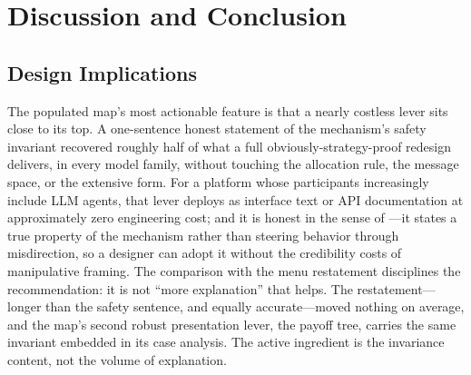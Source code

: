 
\section{Discussion and Conclusion}\label{sec:discussion}

\subsection{Design Implications}\label{sec:discussion-implications}

The populated map's most actionable feature is that a nearly costless lever sits close to its top. A one-sentence honest statement of the mechanism's safety invariant recovered roughly half of what a full obviously-strategy-proof redesign delivers, in every model family, without touching the allocation rule, the message space, or the extensive form. For a platform whose participants increasingly include LLM agents, that lever deploys as interface text or API documentation at approximately zero engineering cost; and it is honest in the sense of \citet{gonczarowski2023strategyproofness}---it states a true property of the mechanism rather than steering behavior through misdirection, so a designer can adopt it without the credibility costs of manipulative framing. The comparison with the menu restatement disciplines the recommendation: it is not ``more explanation'' that helps. The restatement---longer than the safety sentence, and equally accurate---moved nothing on average, and the map's second robust presentation lever, the payoff tree, carries the same invariant embedded in its case analysis. The active ingredient is the invariance content, not the volume of explanation.

